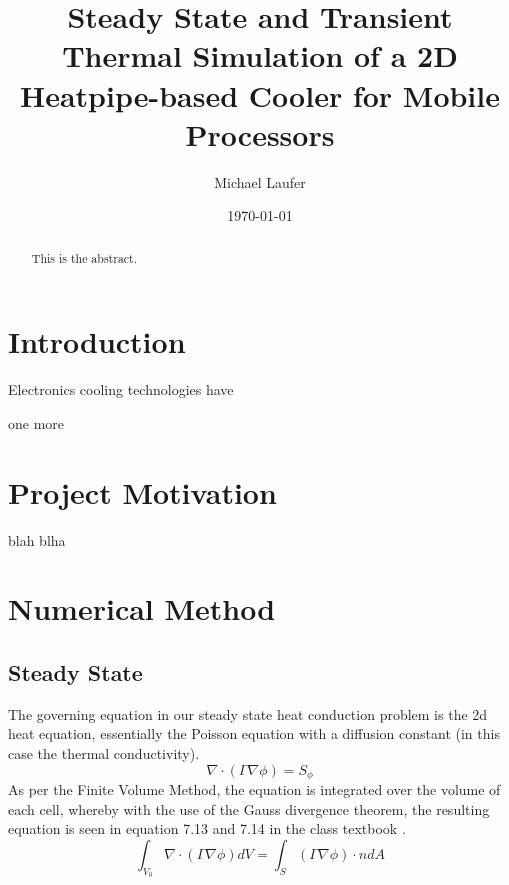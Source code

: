 \documentclass[11pt]{article}
\author{Michael Laufer}
\date{\today}
\title{Steady State and Transient Thermal Simulation of a 2D Heatpipe-based Cooler for Mobile Processors}
\begin{document}
\maketitle
\begin{abstract}

This is the abstract.

\end{abstract}

\section{Introduction}
\label{sec:org575075d}

Electronics cooling  technologies have \cite{versteeg1995introduction} 

one more  
\section{Project Motivation}
\label{sec:org380d714}
blah blha 
\section{Numerical Method}
\label{sec:org8e6c72c}
\subsection{Steady State}
\label{sec:org5d5c538}
The governing equation in our steady state heat conduction problem is the 2d heat equation, essentially the Poisson equation with a diffusion constant (in this case the thermal conductivity).
\[
\nabla \cdot ( \Gamma \nabla \phi ) = S_{\phi}
\]
As per the Finite Volume Method, the equation is integrated over the volume of each cell, whereby with the use of the Gauss divergence theorem, the resulting equation is seen in equation 7.13 and 7.14 in the class textbook \cite{mazumder2015numerical}.
\[
\int_{V_{0}} \nabla \cdot ( \Gamma \nabla \phi ) dV =  \int_{S} ( \Gamma \nabla \phi ) \cdot \hat{n} dA
\]
\end{document}
